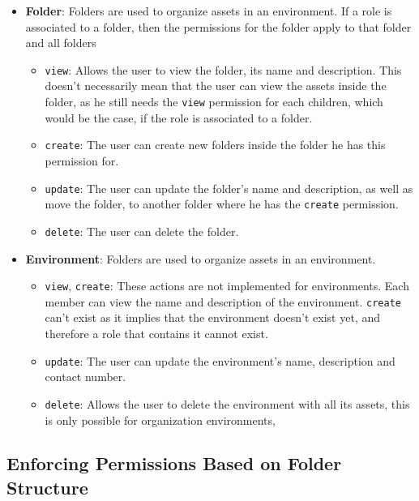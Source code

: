 \begin{itemize}
  \item \textbf{Folder}: Folders are used to organize assets in an environment.
    If a role is associated to a folder, then the permissions for the folder apply to that
    folder and all folders 
  \begin{itemize}
    \item \lstinline{view}: Allows the user to view the folder, its name and description.
      This doesn't necessarily mean that the user can view the assets inside the folder,
      as he still needs the \lstinline{view} permission for each children, which would be
      the case, if the role is associated to a folder.
    \item \lstinline{create}: The user can create new folders inside the folder he has this
      permission for.
    \item \lstinline{update}: The user can update the folder's name and description, as
      well as move the folder, to another folder where he has the \lstinline{create}
      permission.

    \item \lstinline{delete}: The user can delete the folder.
  \end{itemize}
  \item \textbf{Environment}: Folders are used to organize assets in an environment.
  \begin{itemize}
    \item \lstinline{view}, \lstinline{create}: These actions are not implemented for
      environments.
      Each member can view the name and description of the environment.
      \lstinline{create} can't exist as it implies that the environment doesn't exist
      yet, and therefore a role that contains it cannot exist.
    \item \lstinline{update}: The user can update the environment's name, description
      and contact number.
    \item \lstinline{delete}: Allows the user to delete the environment with all its
      assets, this is only possible for organization environments,
  \end{itemize}
\end{itemize}

\subsection{Enforcing Permissions Based on Folder Structure}

